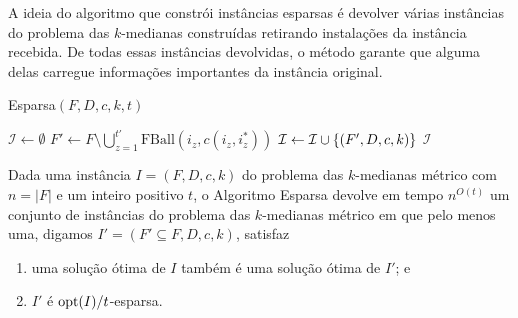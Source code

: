 A ideia do algoritmo que constrói instâncias esparsas é devolver várias instâncias do problema das $k$-medianas construídas retirando instalações da instância recebida. De todas essas instâncias devolvidas, o método garante que alguma delas carregue informações importantes da instância original.

\begin{algorithm}
    \caption{\sc Esparsa$(F,D,c,k,t)$}
    \begin{algorithmic}[1]
        \State $\mathcal{I} \gets \emptyset$
        \State $F' \gets F\setminus \bigcup_{z=1}^{t'} \text{FBall}(i_z,c(i_z,i_z^*))$
        \State $\mathcal{I} \gets \mathcal{I} \cup \{(F',D,c,k)\}$
        \EndFor
        \State \Return $\mathcal{I}$
    \end{algorithmic}
\end{algorithm}

\begin{lemma} \label{lemma:5.3}
    Dada uma instância $I = (F,D,c,k)$ do problema das $k$-medianas métrico com $n = |F|$ e um inteiro positivo $t$, o Algoritmo {\sc Esparsa} devolve em tempo $n^{O(t)}$ um conjunto de instâncias do problema das $k$-medianas métrico em que pelo menos uma, digamos ${I' = (F' \subseteq F,D,c,k)}$, satisfaz
    \begin{enumerate}
        \item uma solução ótima de $I$ também é uma solução ótima de $I'$; e
        \item $I'$ é $\mathrm{opt}(I)/t$-esparsa.
    \end{enumerate}
\end{lemma}

